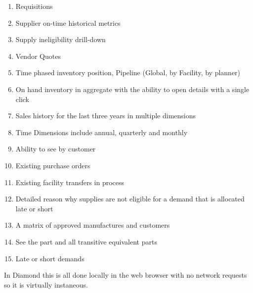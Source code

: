 \documentclass[letterpaper,10pt,english]{sphinxmanual}
\begin{document}
\begin{enumerate}
\item {} 
Requisitions

\item {} 
Supplier on-time historical metrics

\item {} 
Supply ineligibility drill-down

\item {} 
Vendor Quotes

\item {} 
Time phased inventory position, Pipeline (Global, by Facility, by
planner)

\item {} 
On hand inventory in aggregate with the ability to open details with
a single click

\item {} 
Sales history for the last three years in multiple dimensions

\item {} 
Time Dimensions include annual, quarterly and monthly

\item {} 
Ability to see by customer

\item {} 
Existing purchase orders

\item {} 
Existing facility transfers in process

\item {} 
Detailed reason why supplies are not eligible for a demand that is
allocated late or short

\item {} 
A matrix of approved manufactures and customers

\item {} 
See the part and all transitive equivalent parts

\item {} 
Late or short demands

\end{enumerate}

In Diamond this is all done locally in the web browser with no network
requests so it is virtually instaneous.
\end{document}
